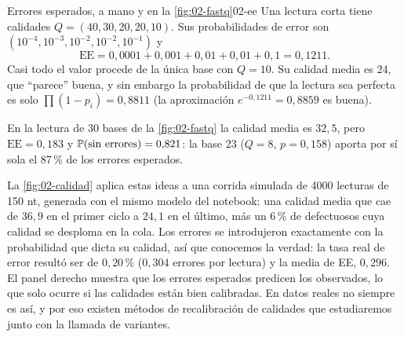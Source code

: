 \begin{ejemplo}{Errores esperados, a mano y en la \cref{fig:02-fastq}}{02-ee}
Una lectura corta tiene calidades $Q=(40,30,20,20,10)$. Sus probabilidades de error son $(10^{-4},10^{-3},10^{-2},10^{-2},10^{-1})$ y
\[
\mathrm{EE} = 0{,}0001+0{,}001+0{,}01+0{,}01+0{,}1 = 0{,}1211.
\]
Casi todo el valor procede de la única base con $Q=10$. Su calidad media es $24$, que ``parece'' buena, y sin embargo la probabilidad de que la lectura sea perfecta es solo $\prod(1-p_i)=0{,}8811$ (la aproximación $e^{-0{,}1211}=0{,}8859$ es buena).

En la lectura de 30 bases de la \cref{fig:02-fastq} la calidad media es $32{,}5$, pero $\mathrm{EE}=0{,}183$ y $\mathbb{P}(\text{sin errores})=0{,}821$: la base 23 ($Q=8$, $p=0{,}158$) aporta por sí sola el 87\,\% de los errores esperados.
\end{ejemplo}


La \cref{fig:02-calidad} aplica estas ideas a una corrida simulada de \num{4000} lecturas de 150 nt, generada con el mismo modelo del notebook: una calidad media que cae de $36{,}9$ en el primer ciclo a $24{,}1$ en el último, más un 6\,\% de  defectuosos cuya calidad se desploma en la cola. Los errores se introdujeron exactamente con la probabilidad que dicta su calidad, así que conocemos la verdad: la tasa real de error resultó ser de $0{,}20\,\%$ ($0{,}304$ errores por lectura) y la media de EE, $0{,}296$. El panel derecho muestra que los errores esperados predicen los observados, lo que solo ocurre si las calidades están bien calibradas. En datos reales no siempre es así, y por eso existen métodos de recalibración de calidades que estudiaremos junto con la llamada de variantes.

